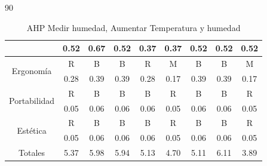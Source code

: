 \begin{table}[h!]
\begin{center}
\begin{turn}{90}
{\begin{tabular}{| c | c | c | c | c | c | c | c | c |}
 & 0.52 & 0.67 & 0.52 & 0.37 & 0.37 & 0.52 & 0.52 & 0.52 \\ \hline
\multirow{2}{*}{Ergonomía} & R & B & B & R & M & B & B & M \\ 
 & 0.28 & 0.39 & 0.39 & 0.28 & 0.17 & 0.39 & 0.39 & 0.17 \\ \hline
\multirow{2}{*}{Portabilidad} & R & B & B & B & R & B & B & R \\ 
 & 0.05 & 0.06 & 0.06 & 0.06 & 0.05 & 0.06 & 0.06  & 0.05 \\ \hline
\multirow{2}{*}{Estética} & R & B & B & B & R & B & B & R \\ 
 & 0.05 & 0.06 & 0.06 & 0.06 & 0.05 & 0.06 & 0.06  & 0.05 \\ \hline
\rowcolor[rgb]{ 1,  1,  0} Totales & 5.37 & 5.98 & 5.94 & 5.13 & 4.70 & 5.11 & 6.11 & 3.89 \\ \hline
\end{tabular}
}
\end{turn}

\caption{AHP Medir humedad, Aumentar Temperatura y humedad}
\label{tab:AHP med hum au tem}
\end{center}
\end{table}


